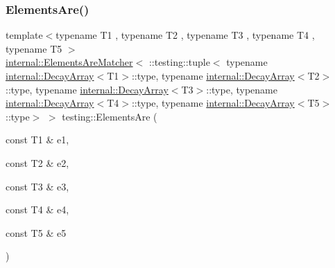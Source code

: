 \mbox{\label{namespacetesting_aa075d52e84310659ca8636c6e7d5c9b2}} 
\subsubsection{\texorpdfstring{Elements\+Are()}{ElementsAre()}\hspace{0.1cm}{\footnotesize\ttfamily [6/11]}}
{\footnotesize\ttfamily template$<$typename T1 , typename T2 , typename T3 , typename T4 , typename T5 $>$ \\
\hyperlink{classtesting_1_1internal_1_1_elements_are_matcher}{internal\+::\+Elements\+Are\+Matcher}$<$ \+::testing\+::tuple$<$ typename \hyperlink{structtesting_1_1internal_1_1_decay_array}{internal\+::\+Decay\+Array}$<$T1$>$\+::type, typename \hyperlink{structtesting_1_1internal_1_1_decay_array}{internal\+::\+Decay\+Array}$<$T2$>$\+::type, typename \hyperlink{structtesting_1_1internal_1_1_decay_array}{internal\+::\+Decay\+Array}$<$T3$>$\+::type, typename \hyperlink{structtesting_1_1internal_1_1_decay_array}{internal\+::\+Decay\+Array}$<$T4$>$\+::type, typename \hyperlink{structtesting_1_1internal_1_1_decay_array}{internal\+::\+Decay\+Array}$<$T5$>$\+::type$>$ $>$ testing\+::\+Elements\+Are (\begin{DoxyParamCaption}\item[{const T1 \&}]{e1,  }\item[{const T2 \&}]{e2,  }\item[{const T3 \&}]{e3,  }\item[{const T4 \&}]{e4,  }\item[{const T5 \&}]{e5 }\end{DoxyParamCaption})\hspace{0.3cm}{\ttfamily [inline]}}

\mbox{\label{namespacetesting_a725b7a52e5eea9fe8f4ce46be6fd7159}} 
